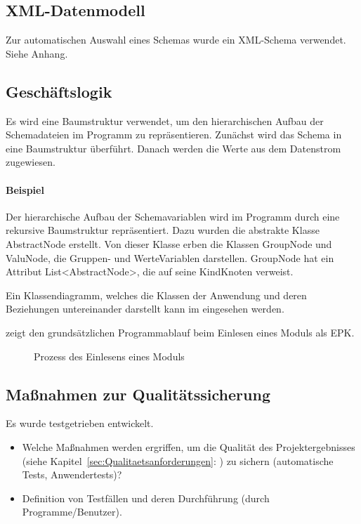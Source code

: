 \subsection{XML-Datenmodell}
Zur automatischen Auswahl eines Schemas wurde ein XML-Schema verwendet. Siehe Anhang.

\subsection{Geschäftslogik}
\label{sec:Geschaeftslogik}
Es wird eine Baumstruktur verwendet, um den hierarchischen Aufbau der Schemadateien im Programm zu repräsentieren.
Zunächst wird das Schema in eine Baumstruktur überführt.
Danach werden die Werte aus dem Datenstrom zugewiesen.



\paragraph{Beispiel}
Der hierarchische Aufbau der Schemavariablen wird im Programm durch eine rekursive Baumstruktur repräsentiert. Dazu wurden die abstrakte Klasse AbstractNode erstellt. Von dieser Klasse erben die Klassen GroupNode und ValuNode, die Gruppen- und WerteVariablen darstellen. GroupNode hat ein Attribut List<AbstractNode>, die auf seine KindKnoten verweist. 

Ein Klassendiagramm, welches die Klassen der Anwendung und deren Beziehungen untereinander darstellt kann im  eingesehen werden.

 zeigt den grundsätzlichen Programmablauf beim Einlesen eines Moduls als \ac{EPK}.
\begin{figure}[htb]
\centering
{}
\caption{Prozess des Einlesens eines Moduls}
\label{fig:Modulimport}
\end{figure}


\subsection{Maßnahmen zur Qualitätssicherung}
\label{sec:Qualitaetssicherung}
Es wurde testgetrieben entwickelt.
\begin{itemize}
	\item Welche Maßnahmen werden ergriffen, um die Qualität des Projektergebnisses (siehe Kapitel~\ref{sec:Qualitaetsanforderungen}: ) zu sichern (\zB automatische Tests, Anwendertests)?
	\item \Ggfs Definition von Testfällen und deren Durchführung (durch Programme/Benutzer).
\end{itemize}


